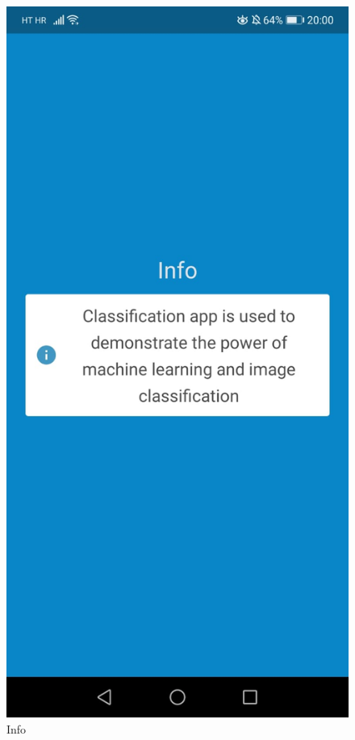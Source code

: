 \documentclass[times, utf8, zavrsni]{fer}
\begin{document}
\begin{figure}[!h]
  \includegraphics[width=1\textwidth]{./slike/app5}
	\caption{Info}
\label{fig:app2}
\endminipage\hfill
\end{figure}
%
\newpage
\end{document}
